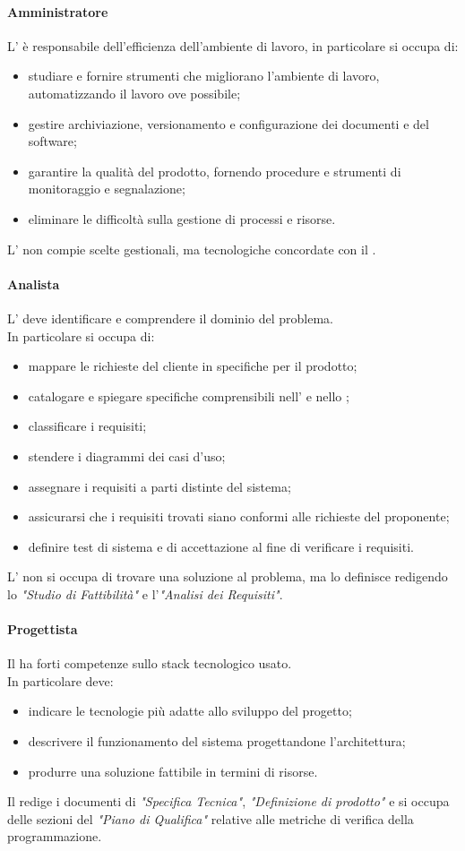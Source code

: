  \paragraph{Amministratore}
 L'\AMM{} è responsabile dell'efficienza dell'ambiente di lavoro, in particolare si occupa di:
 \begin{itemize}
  \item studiare e fornire strumenti che migliorano l'ambiente di lavoro, automatizzando il lavoro ove possibile;
  \item gestire archiviazione, versionamento e configurazione dei documenti e del software;
  \item garantire la qualità del prodotto, fornendo procedure e strumenti di monitoraggio e segnalazione;
  \item eliminare le difficoltà sulla gestione di processi e risorse.
 \end{itemize}
 L'\AMM{} non compie scelte gestionali, ma tecnologiche concordate con il \RESP.
 \paragraph{Analista}
 L'\AN{} deve identificare e comprendere il dominio del problema. \\
 In particolare si occupa di:
 \begin{itemize}
  \item mappare le richieste del cliente in specifiche per il prodotto;
  \item catalogare e spiegare specifiche comprensibili nell'\ARdoc{} e nello \SFdoc{};
  \item classificare i requisiti;
  \item stendere i diagrammi dei casi d'uso;
  \item assegnare i requisiti a parti distinte del sistema;
  \item assicurarsi che i requisiti trovati siano conformi alle richieste del proponente;
  \item definire test di sistema e di accettazione al fine di verificare i requisiti.
\end{itemize}
L'\AN{} non si occupa di trovare una soluzione al problema, ma lo definisce redigendo lo \textit{"Studio di Fattibilità"} e l'\textit{"Analisi dei Requisiti"}. 

 \paragraph{Progettista}
 Il \PJ{} ha forti competenze sullo stack tecnologico usato. \\
 In particolare deve: 
 \begin{itemize}
  \item indicare le tecnologie più adatte allo sviluppo del progetto;
  \item descrivere il funzionamento del sistema progettandone l'architettura;
  \item produrre una soluzione fattibile in termini di risorse.
 \end{itemize}
Il \PJ{} redige i documenti di \textit{"Specifica Tecnica"}, \textit{"Definizione di prodotto"} e si occupa delle sezioni del \textit{"Piano di Qualifica"} relative alle metriche di verifica della programmazione.
\newpage
